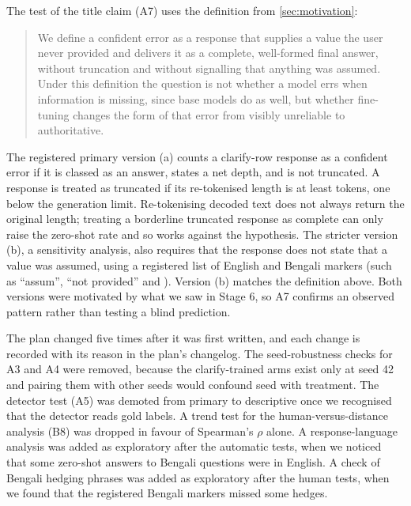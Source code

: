 The test of the title claim (A7) uses the definition from \cref{sec:motivation}:

\begin{quote}
We define a confident error as a response that supplies a value the user never provided and delivers it as a complete, well-formed final answer, without truncation and without signalling that anything was assumed. Under this definition the question is not whether a model errs when information is missing, since base models do as well, but whether fine-tuning changes the form of that error from visibly unreliable to authoritative.
\end{quote}

The registered primary version (a) counts a clarify-row response as a confident error if it is classed as an answer, states a net depth, and is not truncated. A response is treated as truncated if its re-tokenised length is at least \TruncThresholdTok tokens, one below the generation limit. Re-tokenising decoded text does not always return the original length; treating a borderline truncated response as complete can only raise the zero-shot rate and so works against the hypothesis. The stricter version (b), a sensitivity analysis, also requires that the response does not state that a value was assumed, using a registered list of English and Bengali markers (such as ``assum'', ``not provided'' and ). Version (b) matches the definition above. Both versions were motivated by what we saw in Stage 6, so A7 confirms an observed pattern rather than testing a blind prediction.

The plan changed five times after it was first written, and each change is recorded with its reason in the plan's changelog. The seed-robustness checks for A3 and A4 were removed, because the clarify-trained arms exist only at seed 42 and pairing them with other seeds would confound seed with treatment. The detector test (A5) was demoted from primary to descriptive once we recognised that the detector reads gold labels. A trend test for the human-versus-distance analysis (B8) was dropped in favour of Spearman's $\rho$ alone. A response-language analysis was added as exploratory after the automatic tests, when we noticed that some zero-shot answers to Bengali questions were in English. A check of Bengali hedging phrases was added as exploratory after the human tests, when we found that the registered Bengali markers missed some hedges.
